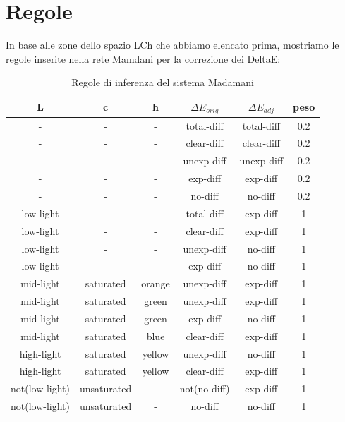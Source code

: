 \section{Regole}
In base alle zone dello spazio LCh che abbiamo elencato prima, mostriamo le regole inserite nella rete Mamdani per la correzione dei DeltaE:
\begin{table}[!ht]
\centering
\begin{tabular}{|c c c c c c |}
\hline
L & c  & h & $\Delta E_{orig}$ & $\Delta E_{adj}$ & peso\\ \hline
-  & -           & -          & total-diff        & total-diff   & 0.2 \\ \hline
-  & -           & -          & clear-diff        & clear-diff   & 0.2 \\ \hline
-  & -           & -          & unexp-diff        & unexp-diff   & 0.2 \\ \hline
-  & -           & -          & exp-diff          & exp-diff   & 0.2 \\ \hline
-  & -           & -          & no-diff          & no-diff   & 0.2 \\ \hline
low-light  & -           & -          & total-diff        & exp-diff   & 1 \\ \hline
low-light  & -           & -          & clear-diff        & exp-diff   & 1 \\ \hline
low-light  & -           & -          & unexp-diff        & no-diff   & 1 \\ \hline
low-light  & -           & -          & exp-diff          & no-diff   & 1 \\ \hline
mid-light  & saturated   & orange     & unexp-diff        & exp-diff   & 1 \\ \hline
mid-light  & saturated   & green      & unexp-diff        & exp-diff   & 1 \\ \hline
mid-light  & saturated   & green      & exp-diff          & no-diff   & 1 \\ \hline
mid-light  & saturated   & blue       & clear-diff        & exp-diff   & 1 \\ \hline
high-light & saturated   & yellow     & unexp-diff        & no-diff   & 1 \\ \hline
high-light & saturated   & yellow     & clear-diff        & exp-diff   & 1 \\ \hline
not(low-light) & unsaturated & -      & not(no-diff)      & exp-diff   & 1 \\ \hline
not(low-light) & unsaturated & -      & no-diff           & no-diff   & 1 \\ \hline
\end{tabular}
\caption{Regole di inferenza del sistema Madamani}
\label{tab:rules}
\end{table}

